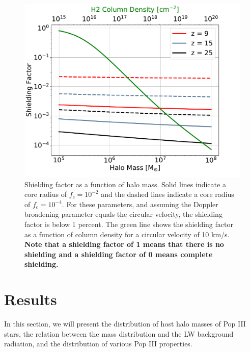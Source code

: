 \documentclass[fleqn,usenatbib]{mnras}
\begin{document}
\begin{figure}
	\includegraphics[width=\columnwidth]{images/shield_mass.pdf}
    \caption{Shielding factor as a function of halo mass. Solid lines indicate a core radius of $f_{c} = 10^{-2}$ and the dashed lines indicate a core radius of $f_{c} = 10^{-4}$. For these parameters, and assuming the Doppler broadening parameter equals the circular velocity, the shielding factor is below 1 percent. The green line shows the shielding factor as a function of \hh{} column density for a circular velocity of 10 km/s. \textbf{Note that a shielding factor of 1 means that there is no shielding and a shielding factor of 0 means complete shielding.}}
    \label{fig:shield_mass}
\end{figure}
\section{Results}
In this section, we will present the distribution of host halo masses of Pop III stars, the relation between the mass distribution and the LW background radiation, and the distribution of various Pop III properties.
\end{document}
